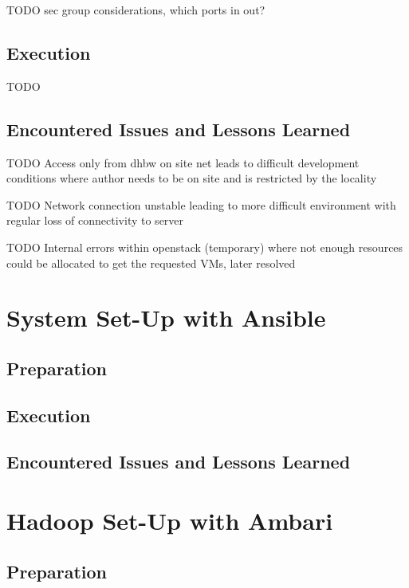 TODO sec group considerations, which ports in out? \autocite[][]{hortonworks2017reference}






\subsection{Execution}

TODO

\subsection{Encountered Issues and Lessons Learned}

TODO Access only from dhbw on site net leads to difficult development conditions where author needs to be on site and is restricted by the locality

TODO Network connection unstable leading to more difficult environment with regular loss of connectivity to server

TODO Internal errors within openstack (temporary) where not enough resources could be allocated to get the requested VMs, later resolved


\section{System Set-Up with Ansible}

\subsection{Preparation}

\subsection{Execution}

\subsection{Encountered Issues and Lessons Learned}


\section{Hadoop Set-Up with Ambari}

\subsection{Preparation}

